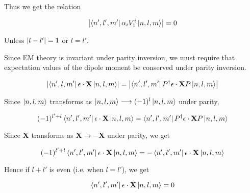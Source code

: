 Thus we get the relation 

\begin{equation}
    \abs{\bra{n',l',m'} \alpha_i V^i_1 \ket{n,l,m}} = 0 
\end{equation}

Unless  $\abs{l - l'} = 1$ or $l = l'$. 

Since EM theory is invariant under parity inversion, we must require that expectation values of the dipole moment be conserved under parity inversion.

\begin{equation}
    \abs{\bra{n',l,m'} \mathbf{\epsilon} \cdot \mathbf{X} \ket{n,l,m}} = \abs{\bra{n',l',m'} P^{\dagger} \mathbf{\epsilon}\cdot \mathbf{X}  P  \ket{n,l,m}} 
\end{equation}

Since $\ket{n,l,m}$ transforms as $\ket{n,l,m} \longrightarrow (-1)^l \ket{n,l,m}$ under parity,

\begin{equation}
    (-1)^{l' + l}\bra{n',l',m'} \mathbf{\epsilon} \cdot \mathbf{X} \ket{n,l,m} = \bra{n',l',m'} P^\dagger  \mathbf{\epsilon}\cdot \mathbf{X} P \ket{n,l,m}
\end{equation}

Since $ \mathbf{X}  $ transforms as $ \mathbf{X}   \longrightarrow - \mathbf{X}  $ under parity, we get

\begin{equation}
    (-1)^{l' + l}\bra{n',l',m'} \mathbf{\epsilon} \cdot \mathbf{X} \ket{n,l,m} = -\bra{n',l',m'}  \mathbf{\epsilon}\cdot \mathbf{X}\ket{n,l,m}
\end{equation}

Hence if $l + l'$ is even (i.e. when $l = l'$), we get 

\begin{equation}
    \bra{n',l',m'} \mathbf{\epsilon} \cdot \mathbf{X} \ket{n,l,m} = 0
\end{equation}
